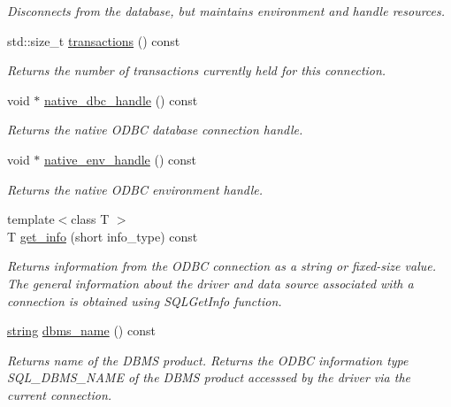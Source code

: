 \begin{DoxyCompactItemize}
\begin{DoxyCompactList}\small\item\em Disconnects from the database, but maintains environment and handle resources. \end{DoxyCompactList}\item 
std\+::size\+\_\+t \mbox{\hyperlink{classnanodbc_1_1connection_ae242ce62a62d14e7fc0e8c741838d258}{transactions}} () const
\begin{DoxyCompactList}\small\item\em Returns the number of transactions currently held for this connection. \end{DoxyCompactList}\item 
void $\ast$ \mbox{\hyperlink{classnanodbc_1_1connection_a4de11a5f93a7bc42092d7be97addea33}{native\+\_\+dbc\+\_\+handle}} () const
\begin{DoxyCompactList}\small\item\em Returns the native O\+D\+BC database connection handle. \end{DoxyCompactList}\item 
void $\ast$ \mbox{\hyperlink{classnanodbc_1_1connection_ac083c91d1f8ae0fad4128c0ce99ae71b}{native\+\_\+env\+\_\+handle}} () const
\begin{DoxyCompactList}\small\item\em Returns the native O\+D\+BC environment handle. \end{DoxyCompactList}\item 
{\footnotesize template$<$class T $>$ }\\T \mbox{\hyperlink{classnanodbc_1_1connection_aaa9d4619442694c11b26e3a044a8e839}{get\+\_\+info}} (short info\+\_\+type) const
\begin{DoxyCompactList}\small\item\em Returns information from the O\+D\+BC connection as a string or fixed-\/size value. The general information about the driver and data source associated with a connection is obtained using {\ttfamily S\+Q\+L\+Get\+Info} function. \end{DoxyCompactList}\item 
\mbox{\hyperlink{namespacenanodbc_abfc0ece56278e590911ec8352774c212}{string}} \mbox{\hyperlink{classnanodbc_1_1connection_a39d2e978322f4f8c24ece6641169fd30}{dbms\+\_\+name}} () const
\begin{DoxyCompactList}\small\item\em Returns name of the D\+B\+MS product. Returns the O\+D\+BC information type S\+Q\+L\+\_\+\+D\+B\+M\+S\+\_\+\+N\+A\+ME of the D\+B\+MS product accesssed by the driver via the current connection. \end{DoxyCompactList}\item 

\end{DoxyCompactItemize}
